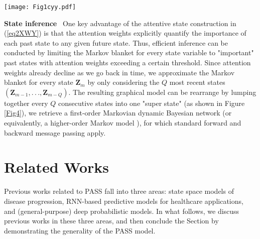 \documentclass[twoside,11pt]{article}
\begin{document}
\begin{figure*}[t]
  \centering
  \texttt{[image: Fig1cyy.pdf]}
	\label{Fig4}
\end{figure*}

{\bf State inference}\,\,\, One key advantage of the attentive state construction in (\ref{eq2XWY}) is that the attention weights explicitly quantify the importance of each past state to any given future state. Thus, efficient inference can be conducted by limiting the Markov blanket for every state variable to "important" past states with attention weights exceeding a certain threshold. Since attention weights already decline as we go back in time, we approximate the Markov blanket for every state $\boldsymbol{Z}_m$ by only considering the $Q$ most recent states $(\boldsymbol{Z}_{m-1},.\,.\,.,\boldsymbol{Z}_{m-Q})$. The resulting graphical model can be rearrange by lumping together every $Q$ consecutive states into one "super state" (as shown in Figure \ref{Fig4}), we retrieve a first-order Markovian dynamic Bayesian network (or equivalently, a higher-order Markov model \cite{murphy2002dynamic}), for which standard forward and backward message passing apply.   



\section{Related Works}
\label{Sec2}

Previous works related to PASS fall into three areas: state space models of disease progression, RNN-based predictive models for healthcare applications, and (general-purpose) deep probabilistic models. In what follows, we discuss previous works in these three areas, and then conclude the Section by demonstrating the generality of the PASS model.
\end{document}

